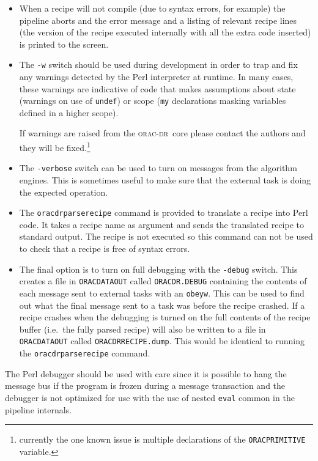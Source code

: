 \documentclass[twoside,11pt]{article}
\renewcommand{\_}{\texttt{\symbol{95}}}
\newcommand{\Oracdr}{\textsc{orac-dr}}
\begin{document}
\begin{itemize}

\item When a recipe will not compile (due to syntax errors, for
example) the pipeline aborts and the error message and a listing of
relevant recipe lines (the version of the recipe executed internally
with all the extra code inserted) is printed to the screen.

\item The \texttt{-w} switch should be used during development 
in order to trap and fix any warnings detected by the Perl interpreter
at runtime. In many cases, these warnings are indicative of code that
makes assumptions about state (warnings on use of \texttt{undef}) or
scope (\texttt{my} declarations masking variables defined in a higher
scope). 

If warnings are raised from the \Oracdr\ core please contact the
authors and they will be fixed.\footnote{currently the one known issue 
is multiple declarations of the \texttt{ORAC\_PRIMITIVE} variable.}

\item The \texttt{-verbose} switch can be used to turn on messages from 
the algorithm engines. This is sometimes useful to make sure that the
external task is doing the expected operation.

\item The \texttt{oracdr\_parse\_recipe} command is provided to translate
a recipe into Perl code. It takes a recipe name as argument and sends the
translated recipe to standard output. The recipe is not executed so this
command can not be used to check that a recipe is free of syntax errors.

\item The final option is to turn on full debugging with the
\texttt{-debug} switch. This creates a file in
\texttt{ORAC\_DATA\_OUT} called \texttt{ORACDR.DEBUG} containing the
contents of each message sent to external tasks with an
\texttt{obeyw}. This can be used to find out what the final message
sent to a task was before the recipe crashed. If a
recipe crashes when the debugging is turned on the full contents of
the recipe buffer (i.e.\ the fully parsed recipe) will also be written 
to a file in \texttt{ORAC\_DATA\_OUT} called
\texttt{ORACDR\_RECIPE.dump}. This would be identical to running the
\texttt{oracdr\_parse\_recipe} command.

\end{itemize}

The Perl debugger should be used with care since it is possible to
hang the message bus if the program is frozen during a message
transaction and the debugger is not optimized for use with the use of nested
\texttt{eval} common in the pipeline internals.
\end{document}
